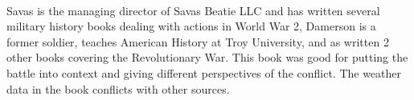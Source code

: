 \\
Savas is the managing director of Savas Beatie LLC and has written several
military history books dealing with actions in World War 2, Damerson is a
former soldier, teaches American History at Troy University, and as written 2
other books covering the Revolutionary War.  This book was good for putting the
battle into context and giving different perspectives of the conflict.  The
weather data in the book conflicts with other sources.
